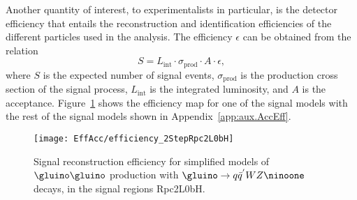 Another quantity of interest, to experimentalists in particular, is the detector
 efficiency that entails the reconstruction and identification efficiencies 
of the different particles used in the analysis. The efficiency $\epsilon$ 
can be obtained from the relation 
\begin{equation}
S = L_\text{int}\cdot\sigma_{\text{prod}}\cdot A\cdot\epsilon, 
\end{equation}
where $S$ is the expected number of signal events, $\sigma_{\text{prod}}$ is the 
production cross section of the signal process, $L_\text{int}$ is the integrated 
luminosity, and $A$ is the acceptance. 
Figure~\ref{fig:strategy.effRpc2L0bH} shows the efficiency map for one of the signal models 
with the rest of the signal models shown in Appendix~\ref{app:aux.AccEff}.
\begin{figure}[htb!]
\centering
\texttt{[image: EffAcc/efficiency\_2StepRpc2L0bH]}
\caption{Signal reconstruction efficiency 
for simplified models of $\gluino\gluino$ production with $\gluino\to q\bar q^{'}WZ\ninoone$ decays, 
in the signal regions Rpc2L0bH.}
\label{fig:strategy.effRpc2L0bH}
\end{figure}

